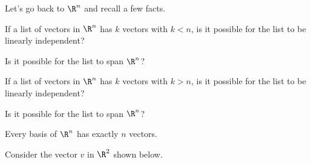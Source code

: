 



Let's go back to $\R^n$ and recall a few facts.  

If a list of vectors in $\R^n$ has $k$ vectors with $k<n$, is it possible for the 
list to be linearly independent?


Is it possible for the list to span $\R^n$?  

 

\endedxproblem


If a list of vectors in $\R^n$ has $k$ vectors with $k>n$, is it possible for the 
list to be linearly independent?


Is it possible for the list to span $\R^n$?  

 

\endedxproblem


\endedxvertical








{}  Every basis of $\R^n$ has exactly $n$ vectors.  

\endedxtext

\endedxvertical







Consider the vector $v$ in $\R^2$ shown below.  

\begin{center}

\end{center}

